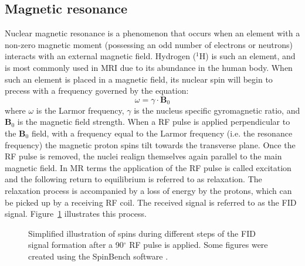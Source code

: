 \subsection{Magnetic resonance}
Nuclear magnetic resonance is a phenomenon that occurs when an element with a non-zero magnetic moment (possessing an odd number of electrons or neutrons) interacts with an external magnetic field. Hydrogen ($^1$H) is such an element, and is most commonly used in MRI due to its abundance in the human body. When such an element is placed in a magnetic field, its nuclear spin will begin to precess with a frequency governed by the equation:
\begin{equation}
\omega =\gamma \cdot \mathbf{B}_0 
\end{equation}
where $\omega$ is the Larmor frequency, $\gamma$ is the nucleus specific gyromagnetic ratio, and $\mathbf{B}_0$ is the magnetic field strength. When a \gls{RF} pulse is applied perpendicular to the $\mathbf{B}_0$ field, with a frequency equal to the Larmor frequency (i.e. the resonance frequency) the magnetic proton spins tilt towards the transverse plane. Once the \gls{RF} pulse is removed, the nuclei realign themselves again parallel to the main magnetic field. In MR terms the application of the \gls{RF} pulse is called excitation and the following return to equilibrium is referred to as relaxation. The relaxation process is accompanied by a loss of energy by the protons, which can be picked up by a receiving \gls{RF} coil. The received signal is referred to as the \gls{FID} signal. Figure~\ref{fig:chapter2 spin FIDs} illustrates this process. 

\begin{figure}[H]
\centering
{}
\caption{Simplified illustration of spins during different steps of the FID signal formation after a 90$^\circ$ RF pulse is applied. Some figures were created using the SpinBench software \citep{Overall:2007}.}
\label{fig:chapter2 spin FIDs}
\end{figure}

